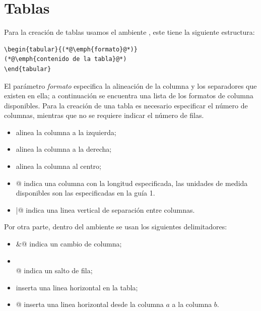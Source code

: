 \documentclass[a4,10pt]{aleph-notas}
\begin{document}
\encabezado

\informacion

\tableofcontents

\section{Tablas}

Para la creación de tablas usamos el ambiente \verb@tabular@, este tiene la siguiente estructura:

\begin{lstlisting}[frame=single]
\begin{tabular}{(*@\emph{formato}@*)}
(*@\emph{contenido de la tabla}@*)
\end{tabular}
\end{lstlisting}

El parámetro \emph{formato} especifica la alineación de la columna y los separadores que existen en ella; a continuación se encuentra una lista de los formatos de columna disponibles. Para la creación de una tabla es necesario especificar el número de columnas, mientras que no se requiere indicar el número de filas.

\begin{itemize}
    \item \verb@l@ alinea la columna a la izquierda;
    \item \verb@r@ alinea la columna a la derecha;
    \item \verb@c@ alinea la columna al centro;
    \item {}@ indica una columna con la longitud especificada, las unidades de medida disponibles son las especificadas en la guía 1.
    \item \verb@|@ indica una linea vertical de separación entre columnas.
\end{itemize}

Por otra parte, dentro del ambiente se usan los siguientes delimitadores:

\begin{itemize}
    \item \verb@&@ indica un cambio de columna;
    \item \verb@\\@ indica un salto de fila;
    \item \verb@\hline@ inserta una linea horizontal en la tabla;
    \item \verb@{}@ inserta una linea horizontal desde la columna $a$ a la columna $b$.
\end{itemize}
\end{document}
